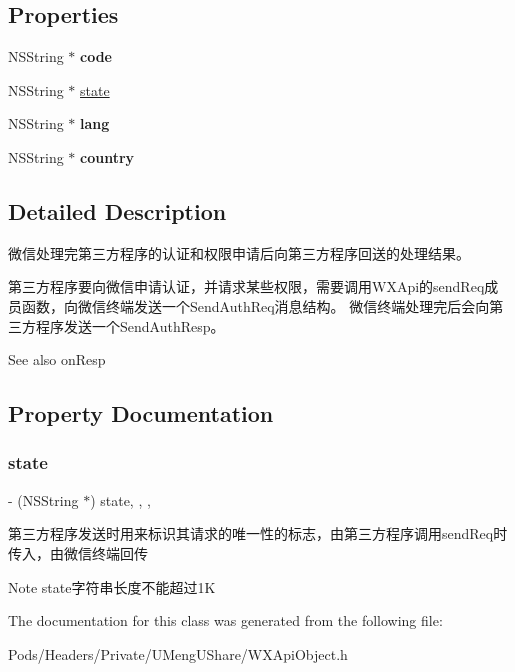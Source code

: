 \subsection*{Properties}
\begin{DoxyCompactItemize}
\item 
\mbox{\label{interface_send_auth_resp_a3a2f2756e86baaceda03c29e5e9c2504}} 
N\+S\+String $\ast$ {\bfseries code}
\item 
N\+S\+String $\ast$ \mbox{\hyperlink{interface_send_auth_resp_ae7d5799fb5503514df1f303b2cf4de19}{state}}
\item 
\mbox{\label{interface_send_auth_resp_a573cd8c24e6b0a7fcecd532231ac5557}} 
N\+S\+String $\ast$ {\bfseries lang}
\item 
\mbox{\label{interface_send_auth_resp_a7efe5fe2f224bfcf0a941cfd96e72781}} 
N\+S\+String $\ast$ {\bfseries country}
\end{DoxyCompactItemize}


\subsection{Detailed Description}
微信处理完第三方程序的认证和权限申请后向第三方程序回送的处理结果。 

第三方程序要向微信申请认证，并请求某些权限，需要调用\+W\+X\+Api的send\+Req成员函数，向微信终端发送一个\+Send\+Auth\+Req消息结构。 微信终端处理完后会向第三方程序发送一个\+Send\+Auth\+Resp。 \begin{DoxySeeAlso}{See also}
on\+Resp 
\end{DoxySeeAlso}


\subsection{Property Documentation}
\mbox{\label{interface_send_auth_resp_ae7d5799fb5503514df1f303b2cf4de19}} 
\subsubsection{\texorpdfstring{state}{state}}
{\footnotesize\ttfamily -\/ (N\+S\+String $\ast$) state\hspace{0.3cm}{\ttfamily [read]}, {\ttfamily [write]}, {\ttfamily [nonatomic]}, {\ttfamily [retain]}}

第三方程序发送时用来标识其请求的唯一性的标志，由第三方程序调用send\+Req时传入，由微信终端回传 \begin{DoxyNote}{Note}
state字符串长度不能超过1K 
\end{DoxyNote}


The documentation for this class was generated from the following file\+:\begin{DoxyCompactItemize}
\item 
Pods/\+Headers/\+Private/\+U\+Meng\+U\+Share/W\+X\+Api\+Object.\+h\end{DoxyCompactItemize}
